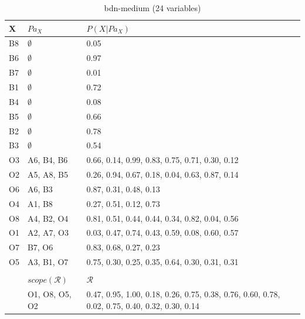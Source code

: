 \documentclass{article}
\newcommand{\Pa}{\mathit{Pa}}
\begin{document}
		\begin{table}[h]
			\centering
			\begin{tabular}{@{}llp{6cm}@{}}
				X & $\Pa_X$ & $P(X | \Pa_X)$ \\
				\midrule
				B8 & $\emptyset$ & 0.05 \\
				B6 & $\emptyset$ & 0.97 \\
				B7 & $\emptyset$ & 0.01 \\
				B1 & $\emptyset$ & 0.72 \\
				B4 & $\emptyset$ & 0.08 \\
				B5 & $\emptyset$ & 0.66 \\
				B2 & $\emptyset$ & 0.78 \\
				B3 & $\emptyset$ & 0.54 \\
				O3 & A6, B4, B6 & 0.66, 0.14, 0.99, 0.83, 0.75, 0.71, 0.30, 0.12 \\
				O2 & A5, A8, B5 & 0.26, 0.94, 0.67, 0.18, 0.04, 0.63, 0.87, 0.14 \\
				O6 & A6, B3 & 0.87, 0.31, 0.48, 0.13 \\
				O4 & A1, B8 & 0.27, 0.51, 0.12, 0.73 \\
				O8 & A4, B2, O4 & 0.81, 0.51, 0.44, 0.44, 0.34, 0.82, 0.04, 0.56 \\
				O1 & A2, A7, O3 & 0.03, 0.47, 0.74, 0.43, 0.59, 0.08, 0.60, 0.57 \\
				O7 & B7, O6 & 0.83, 0.68, 0.27, 0.23 \\
				O5 & A3, B1, O7 & 0.75, 0.30, 0.25, 0.35, 0.64, 0.30, 0.31, 0.31 \\
				\bottomrule
				\\
				& $scope(\mathcal{R})$ & $\mathcal{R}$ \\
				\midrule
				& O1, O8, O5, O2 & 0.47, 0.95, 1.00, 0.18, 0.26, 0.75, 0.38, 0.76, 0.60, 0.78, 0.02, 0.75, 0.40, 0.32, 0.30, 0.14
			\end{tabular}
			\caption{bdn-medium (24 variables)}
			\label{table:medium}
		\end{table}
		
\end{document}
